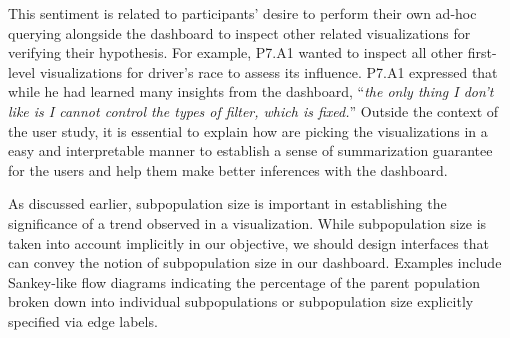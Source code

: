 \npar This sentiment is related to participants' desire to perform their own ad-hoc querying alongside the dashboard to inspect other related visualizations for verifying their hypothesis. For example, P7.A1 wanted to inspect all other first-level visualizations for driver's race to assess its influence. P7.A1 expressed that while he had learned many insights from the dashboard, ``\textit{the only thing I don't like is I cannot control the types of filter, which is fixed.}'' Outside the context of the user study, it is essential to explain how \system are picking the visualizations in a easy and interpretable manner to establish a sense of summarization guarantee for the users and help them make better inferences with the dashboard.
\par As discussed earlier, subpopulation size is important in establishing the significance of a trend observed in a visualization. While subpopulation size is taken into account implicitly in our objective, we should design interfaces that can convey the notion of subpopulation size in our dashboard. Examples include Sankey-like flow diagrams indicating the percentage of the parent population broken down into individual subpopulations or subpopulation size explicitly specified via edge labels.%
